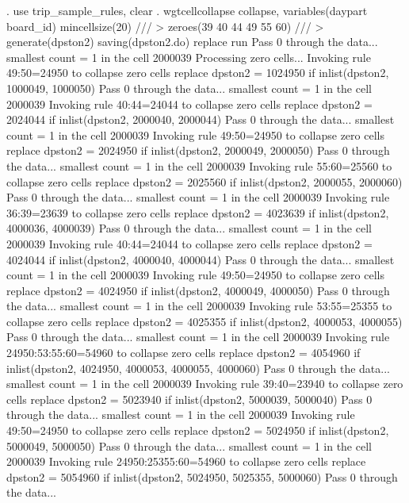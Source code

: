 . use trip_sample_rules, clear
{\smallskip}
. wgtcellcollapse collapse, variables(daypart board_id) mincellsize(20) ///
>         zeroes(39 40 44 49 55 60) ///
>         generate(dpston2) saving(dpston2.do) replace run
Pass 0 through the data...
  smallest count = 1 in the cell      2000039
{\smallskip}
Processing zero cells...
{\smallskip}
  Invoking rule 49:50=24950 to collapse zero cells
  replace dpston2 = 1024950 if inlist(dpston2, 1000049, 1000050)
Pass 0 through the data...
  smallest count = 1 in the cell      2000039
  Invoking rule 40:44=24044 to collapse zero cells
  replace dpston2 = 2024044 if inlist(dpston2, 2000040, 2000044)
Pass 0 through the data...
  smallest count = 1 in the cell      2000039
  Invoking rule 49:50=24950 to collapse zero cells
  replace dpston2 = 2024950 if inlist(dpston2, 2000049, 2000050)
Pass 0 through the data...
  smallest count = 1 in the cell      2000039
  Invoking rule 55:60=25560 to collapse zero cells
  replace dpston2 = 2025560 if inlist(dpston2, 2000055, 2000060)
Pass 0 through the data...
  smallest count = 1 in the cell      2000039
  Invoking rule 36:39=23639 to collapse zero cells
  replace dpston2 = 4023639 if inlist(dpston2, 4000036, 4000039)
Pass 0 through the data...
  smallest count = 1 in the cell      2000039
  Invoking rule 40:44=24044 to collapse zero cells
  replace dpston2 = 4024044 if inlist(dpston2, 4000040, 4000044)
Pass 0 through the data...
  smallest count = 1 in the cell      2000039
  Invoking rule 49:50=24950 to collapse zero cells
  replace dpston2 = 4024950 if inlist(dpston2, 4000049, 4000050)
Pass 0 through the data...
  smallest count = 1 in the cell      2000039
  Invoking rule 53:55=25355 to collapse zero cells
  replace dpston2 = 4025355 if inlist(dpston2, 4000053, 4000055)
Pass 0 through the data...
  smallest count = 1 in the cell      2000039
  Invoking rule 24950:53:55:60=54960 to collapse zero cells
  replace dpston2 = 4054960 if inlist(dpston2, 4024950, 4000053, 4000055, 4000060)
Pass 0 through the data...
  smallest count = 1 in the cell      2000039
  Invoking rule 39:40=23940 to collapse zero cells
  replace dpston2 = 5023940 if inlist(dpston2, 5000039, 5000040)
Pass 0 through the data...
  smallest count = 1 in the cell      2000039
  Invoking rule 49:50=24950 to collapse zero cells
  replace dpston2 = 5024950 if inlist(dpston2, 5000049, 5000050)
Pass 0 through the data...
  smallest count = 1 in the cell      2000039
  Invoking rule 24950:25355:60=54960 to collapse zero cells
  replace dpston2 = 5054960 if inlist(dpston2, 5024950, 5025355, 5000060)
Pass 0 through the data...
